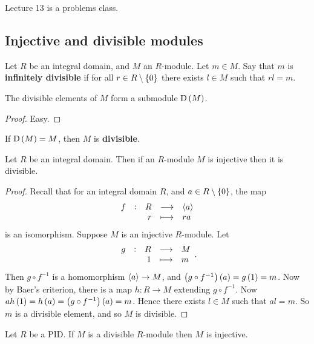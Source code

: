 
Lecture 13 is a problems class.

\pagebreak

\subsection{Injective and divisible modules}


\begin{definition}
Let $ R $ be an integral domain, and $ M $ an $ R $-module. Let $ m \in M $. Say that $ m $ is \textbf{infinitely divisible} if for all $ r \in R \setminus \cbr{0} $ there exists $ l \in M $ such that $ rl = m $.
\end{definition}

\begin{proposition}
The divisible elements of $ M $ form a submodule $ \D\br{M} $.
\end{proposition}

\begin{proof}
Easy.
\end{proof}

\begin{definition}
If $ \D\br{M} = M $, then $ M $ is \textbf{divisible}.
\end{definition}

\begin{proposition}
Let $ R $ be an integral domain. Then if an $ R $-module $ M $ is injective then it is divisible.
\end{proposition}

\begin{proof}
Recall that for an integral domain $ R $, and $ a \in R \setminus \cbr{0} $, the map
$$ \function[f]{R}{\abr{a}}{r}{ra} $$
is an isomorphism. Suppose $ M $ is an injective $ R $-module. Let
$$ \function[g]{R}{M}{1}{m}. $$
Then $ g \circ f^{-1} $ is a homomorphism $ \left\langle a \right\rangle \to M $, and $ \br{g \circ f^{-1}}\br{a} = g\br{1} = m $. Now by Baer's criterion, there is a map $ h : R \to M $ extending $ g \circ f^{-1} $. Now $ ah\br{1} = h\br{a} = \br{g \circ f^{-1}}\br{a} = m $. Hence there exists $ l \in M $ such that $ al = m $. So $ m $ is a divisible element, and so $ M $ is divisible.
\end{proof}

\begin{proposition}
Let $ R $ be a PID. If $ M $ is a divisible $ R $-module then $ M $ is injective.
\end{proposition}


